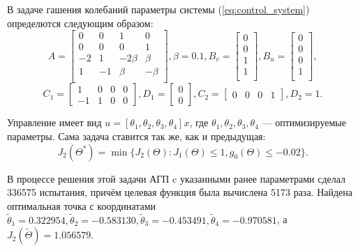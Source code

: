 В задаче гашения колебаний параметры системы (\ref{eq:control_system}) определются следующим
образом:
$$
A=\begin{bmatrix}
  0  & 0 & 1 & 0 \\
  0  & 0 & 0 & 1 \\
  -2  & 1 & -2\beta & \beta \\
  1  & -1 & \beta & -\beta \\
\end{bmatrix}, \beta = 0.1,
B_v=\begin{bmatrix}
0       \\
0       \\
1       \\
1       \\
\end{bmatrix},
B_u=\begin{bmatrix}
0       \\
0       \\
0       \\
1       \\
\end{bmatrix},
$$
$$
C_1=\begin{bmatrix}
1 & 0 & 0 & 0 \\
-1 & 1 & 0 & 0
\end{bmatrix},
D_1=\begin{bmatrix}
0 \\
0
\end{bmatrix},
C_2=\begin{bmatrix}
0 & 0 & 0  & 1
\end{bmatrix},D_2=1.
$$

Управление имеет вид \(u=[\theta_1,\theta_2, \theta_3,\theta_4]x\), где \(\theta_1,\theta_2, \theta_3,\theta_4\) ---
оптимизируемые параметры. Сама задача ставится так же, как и предыдущая:
\begin{displaymath}
   J_2(\Theta^*)=\min\{J_2(\Theta):J_1(\Theta)\leqslant 1, g_0(\Theta)\leqslant -0.02\}.
\end{displaymath}

В процессе решения этой задачи АГП c указанными ранее параметрами сделал 336575 испытания, причём целевая функция
была вычислена 5173 раза. Найдена оптимальная точка с координатами
\(\widetilde\theta_1 =0.322954,\widetilde\theta_2=-0.583130, \widetilde\theta_3=-0.453491, \widetilde\theta_4=-0.970581\),
а \(J_2(\widetilde\Theta)=1.056579\).
